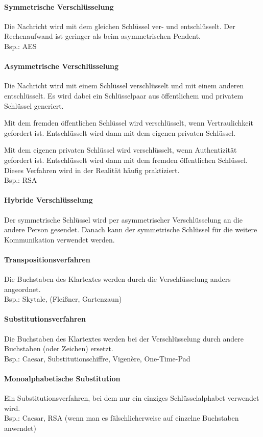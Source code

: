 \documentclass[10pt]{article}
\begin{document}
\paragraph{Symmetrische Verschlüsselung} Die Nachricht wird mit dem gleichen Schlüssel ver- und entschlüsselt. Der Rechenaufwand ist geringer als beim asymmetrischen Pendent.\\
Bsp.: AES
\paragraph{Asymmetrische Verschlüsselung} Die Nachricht wird mit einem Schlüssel verschlüsselt und mit einem anderen entschlüsselt. Es wird dabei ein Schlüsselpaar aus öffentlichem und privatem Schlüssel generiert.

Mit dem fremden öffentlichen Schlüssel wird verschlüsselt, wenn Vertraulichkeit gefordert ist. Entschlüsselt wird dann mit dem eigenen privaten Schlüssel.

Mit dem eigenen privaten Schlüssel wird verschlüsselt, wenn Authentizität gefordert ist. Entschlüsselt wird dann mit dem fremden öffentlichen Schlüssel. Dieses Verfahren wird in der
Realität häufig praktiziert.
\\
Bsp.: RSA
\paragraph{Hybride Verschlüsselung} Der symmetrische Schlüssel wird per asymmetrischer Verschlüsselung an die andere Person gesendet. Danach kann der symmetrische Schlüssel für die weitere Kommunikation verwendet werden.
\paragraph{Transpositionsverfahren} Die Buchstaben des Klartextes werden durch die Verschlüsselung anders angeordnet.\\
Bsp.: Skytale, (Fleißner, Gartenzaun)
\paragraph{Substitutionsverfahren} Die Buchstaben des Klartextes werden bei der Verschlüsselung durch andere Buchstaben (oder Zeichen) ersetzt.\\
Bsp.: Caesar, Substitutionschiffre, Vigenère, One-Time-Pad
\paragraph{Monoalphabetische Substitution} Ein Substitutionsverfahren, bei dem nur ein einziges Schlüsselalphabet verwendet wird.\\
Bsp.: Caesar, RSA (wenn man es fälschlicherweise auf einzelne Buchstaben anwendet)
\end{document}
